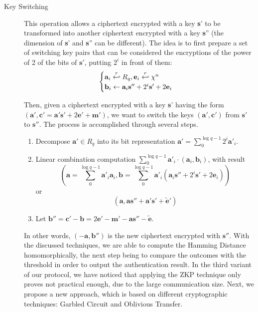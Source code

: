 \begin{description}
\item[Key Switching] This operation allows a ciphertext encrypted with a key
  \textbf{s}' to be transformed into another ciphertext encrypted with a  key
  \textbf{s}'' (the dimension of \textbf{s}' and \textbf{s}'' can be
  different). The idea is to first prepare a set of switching key pairs that can
  be considered the encryptions of the power of 2 of the bits of $\mathbf{s}'$,
  putting $2^{i}$ in front of them:
  \[
    \begin{cases}
      \mathbf{a}_{i} \stackrel{r}{\hookleftarrow} R_{q}, \mathbf{e}_{i} \stackrel{r}{\hookleftarrow} \chi^{n}\\
      \mathbf{b}_{i} \gets \mathbf{a}_{i}\mathbf{s}'' + 2^{i}\mathbf{s}' + 2\mathbf{e}_{i}
    \end{cases}
  \]

  Then, given a ciphertext encrypted with a key \textbf{s}' having the form
  $(\mathbf{a}', \mathbf{c}' = \mathbf{a}'\mathbf{s}' + 2\mathbf{e}' +
  \mathbf{m}')$, we want to switch the keys $(\mathbf{a}',\mathbf{c}')$ from
  $\mathbf{s}'$ to $\mathbf{s}''$. The process is accomplished through several steps.
  \begin{enumerate}
  \item Decompose $\mathbf{a}' \in R_{q}$ into its bit representation
    $\mathbf{a}' = \sum_{0}^{\log q - 1}2^{i}\mathbf{a}'_{i}$.
  \item Linear combination computation
    $\sum_{0}^{\log q - 1}\mathbf{a}'_{i} \cdot (\mathbf{a}_{i},
    \mathbf{b}_{i})$, with result
    $$(\mathbf{a} = \sum_{0}^{\log q - 1}\mathbf{a}'_{i}\mathbf{a}_{i},
    \mathbf{b} = \sum_{0}^{\log q - 1}\mathbf{a}'_{i}(\mathbf{a}_{i}\mathbf{s}''
    + 2^{i}\mathbf{s}' + 2\mathbf{e}_{i}))$$
    or
    $$(\mathbf{a}, \mathbf{a}\mathbf{s}'' + \mathbf{a}'\mathbf{s}' + \tilde{\mathbf{e}}')$$
  \item Let $\mathbf{b}'' = \mathbf{c}' - \mathbf{b} = 2\mathbf{e}' - \mathbf{m}' -\mathbf{a}\mathbf{s}'' - \tilde{\mathbf{e}}$.
  \end{enumerate}

  In other words, $(-\mathbf{a}, \mathbf{b}'')$ is the new ciphertext encrypted
  with $\mathbf{s}''$. With the discussed techniques, we are able to compute the
  Hamming Distance homomorphically, the next step being to compare the outcomes
  with the threshold in order to output the authentication result. In the third variant
  of our protocol, we have noticed that applying the ZKP technique only proves not practical
  enough, due to the large communication size. Next, we propose a new approach,
  which is based on different cryptographic techniques: Garbled Circuit and
  Oblivious Transfer.
\end{description}

